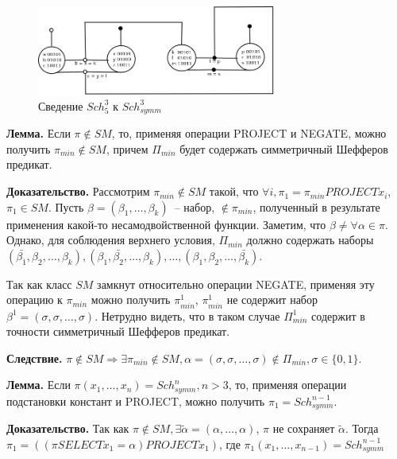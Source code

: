 \documentclass[12pt]{article}
\begin{document}
\begin{figure}[htb]
\centering
\includegraphics[width=0.7\textwidth]{scheff5.png}
\caption{Сведение $Sch_5^3$ к $Sch_{symm}^3$}
\label{fig:scheff3_5}
\end{figure}



\label{eq:lemma_sm}
\textbf{Лемма.} Если $\pi \notin SM$, то, применяя операции PROJECT и NEGATE,
можно получить $\pi_{min} \notin SM$, причем $\Pi_{min}$ будет содержать симметричный Шефферов предикат.

\textbf{Доказательство.} Рассмотрим $\pi_{min} \notin SM$ такой, что $\forall i, \pi_1 = \pi_{min} PROJECT x_i$, $\pi_1 \in SM$.
Пусть $\beta = (\beta_1, \dots, \beta_k)$~-- набор, $\notin \pi_{min}$, полученный в результате применения какой-то несамодвойственной функции.
Заметим, что $\beta \neq \forall \alpha \in \pi$. Однако, для соблюдения верхнего условия, $\Pi_{min}$ должно содержать наборы 
$(\bar{\beta_1}, \beta_2, \dots, \beta_k), (\beta_1, \bar{\beta_2}, \dots, \beta_k), \dots, (\beta_1, \beta_2, \dots, \bar{\beta_k})$.

Так как класс $SM$ замкнут относительно операции NEGATE, применяя эту операцию к $\pi_{min}$ можно получить $\pi_{min}^1$,
$\pi_{min}^1$ не содержит набор $\beta^1 = (\sigma, \sigma, \dots, \sigma)$. 
Нетрудно видеть, 
что в таком случае $\Pi_{min}^1$ содержит в точности симметричный Шефферов предикат.

\textbf{Следствие.} $\pi \notin SM \Longrightarrow \exists \pi_{min} \notin SM, \alpha = (\sigma, \sigma, \dots, \sigma) \notin \Pi_{min}, \sigma \in \{0, 1\}$.

\textbf{Лемма.} Если $\pi(x_1, \dots, x_n) = Sch_{symm}^n, n > 3$, то, применяя операции подстановки констант и PROJECT, можно
получить $\pi_1 = Sch_{symm}^{n-1}$.

\textbf{Доказательство.} Так как 
$\pi \notin SM, \exists \widetilde{\alpha} = (\alpha, \dots, \alpha)$, $\pi$ не сохраняет $\widetilde{\alpha}$.
Тогда 
$\pi_1 = ( (\pi SELECT x_1=\alpha)  PROJECT  x_1 )$, где $\pi_1(x_1, \dots, x_{n-1}) = Sch_{symm}^{n-1}$
\end{document}
